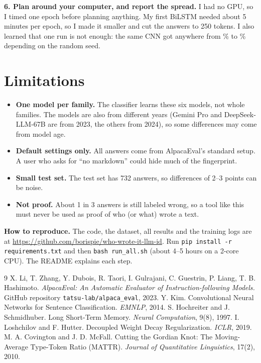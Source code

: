\documentclass[11pt,letterpaper]{article}
\newcommand{\ttt}[1]{\texttt{\small #1}}
\begin{document}
\textbf{6. Plan around your computer, and report the spread.} I had no GPU, so I timed one epoch before planning
anything. My first BiLSTM needed about 5 minutes per epoch, so I made it smaller and cut the answers to 250
tokens. I also learned that one run is not enough: the same CNN got anywhere from \CnnMin\% to \CnnMax\%
depending on the random seed.

\section{Limitations}

\begin{itemize}
  \item \textbf{One model per family.} The classifier learns these six models, not whole families. The models are
        also from different years (Gemini Pro and DeepSeek-LLM-67B are from 2023, the others from 2024), so some
        differences may come from model age.
  \item \textbf{Default settings only.} All answers come from AlpacaEval's standard setup. A user who asks for
        ``no markdown'' could hide much of the fingerprint.
  \item \textbf{Small test set.} The test set has 732 answers, so differences of 2--3 points can be noise.
  \item \textbf{Not proof.} About 1 in 3 answers is still labeled wrong, so a tool like this must never be used as
        proof of who (or what) wrote a text.
\end{itemize}

\textbf{How to reproduce.} The code, the dataset, all results and the training logs are at
\url{https://github.com/borispie/who-wrote-it-llm-id}. Run \ttt{pip install -r requirements.txt} and then
\ttt{bash run\_all.sh} (about 4--5 hours on a 2-core CPU). The README explains each step.

{\small
\begin{thebibliography}{9}
\setlength{\itemsep}{1pt}\setlength{\parskip}{0pt}
 X. Li, T. Zhang, Y. Dubois, R. Taori, I. Gulrajani, C. Guestrin, P. Liang, T. B. Hashimoto.
  \emph{AlpacaEval: An Automatic Evaluator of Instruction-following Models.} GitHub repository
  \ttt{tatsu-lab/alpaca\_eval}, 2023.
 Y. Kim. Convolutional Neural Networks for Sentence Classification. \emph{EMNLP}, 2014.
 S. Hochreiter and J. Schmidhuber. Long Short-Term Memory. \emph{Neural Computation}, 9(8), 1997.
 I. Loshchilov and F. Hutter. Decoupled Weight Decay Regularization. \emph{ICLR}, 2019.
 M. A. Covington and J. D. McFall. Cutting the Gordian Knot: The Moving-Average Type-Token Ratio
  (MATTR). \emph{Journal of Quantitative Linguistics}, 17(2), 2010.
\end{thebibliography}
}
\end{document}
